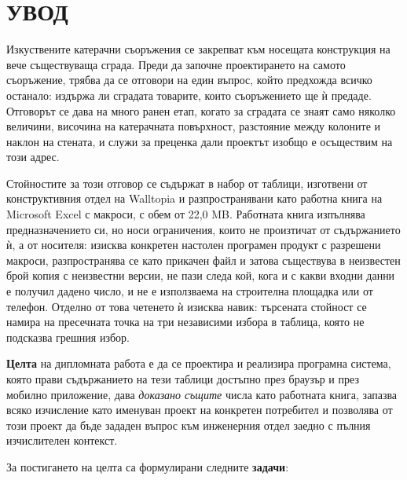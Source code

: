 %
\section*{УВОД}
\label{sec:introduction}

Изкуствените катерачни съоръжения се закрепват към носещата конструкция на вече
съществуваща сграда. Преди да започне проектирането на самото съоръжение, трябва да
се отговори на един въпрос, който предхожда всичко останало: издържа ли сградата
товарите, които съоръжението ще ѝ предаде. Отговорът се дава на много ранен етап,
когато за сградата се знаят само няколко величини, височина на катерачната
повърхност, разстояние между колоните и наклон на стената, и служи за преценка дали
проектът изобщо е осъществим на този адрес.

Стойностите за този отговор се съдържат в набор от таблици, изготвени от
конструктивния отдел на Walltopia и разпространявани като работна книга на Microsoft
Excel с макроси, с обем от 22{,}0 MB. Работната книга изпълнява предназначението си,
но носи ограничения, които не произтичат от съдържанието ѝ, а от носителя: изисква
конкретен настолен програмен продукт с разрешени макроси, разпространява се като
прикачен файл и затова съществува в неизвестен брой копия с неизвестни версии, не
пази следа кой, кога и с какви входни данни е получил дадено число, и не е използваема
на строителна площадка или от телефон. Отделно от това четенето ѝ изисква навик:
търсената стойност се намира на пресечната точка на три независими избора в таблица,
която не подсказва грешния избор.

\textbf{Целта} на дипломната работа е да се проектира и реализира програмна система,
която прави съдържанието на тези таблици достъпно през браузър и през мобилно
приложение, дава \emph{доказано същите} числа като работната книга, запазва всяко
изчисление като именуван проект на конкретен потребител и позволява от този проект да
бъде зададен въпрос към инженерния отдел заедно с пълния изчислителен контекст.

За постигането на целта са формулирани следните \textbf{задачи}:

